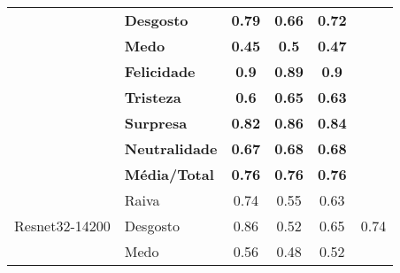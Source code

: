 \begin{table}[]
\begin{tabular}{llcccc}
                                         & \textbf{Desgosto}     & \textbf{0.79}                         & \textbf{0.66}                          & \textbf{0.72}                         &                                       \\
                                         & \textbf{Medo}         & \textbf{0.45}                         & \textbf{0.5}                           & \textbf{0.47}                         &                                       \\
                                         & \textbf{Felicidade}   & \textbf{0.9}                          & \textbf{0.89}                          & \textbf{0.9}                          &                                       \\
                                         & \textbf{Tristeza}     & \textbf{0.6}                          & \textbf{0.65}                          & \textbf{0.63}                         &                                       \\
                                         & \textbf{Surpresa}     & \textbf{0.82}                         & \textbf{0.86}                          & \textbf{0.84}                         &                                       \\
                                         & \textbf{Neutralidade} & \textbf{0.67}                         & \textbf{0.68}                          & \textbf{0.68}                         &                                       \\
                                         & \textbf{Média/Total}  & \textbf{0.76}                         & \textbf{0.76}                          & \textbf{0.76}                         &                                       \\ \hline
\multirow{8}{*}{Resnet32-14200}          & Raiva                 & 0.74                                  & 0.55                                   & 0.63                                  & \multirow{8}{*}{0.74}                 \\
                                         & Desgosto              & 0.86                                  & 0.52                                   & 0.65                                  &                                       \\
                                         & Medo                  & 0.56                                  & 0.48                                   & 0.52                                  &                                       \\

\end{tabular}
\end{table}
